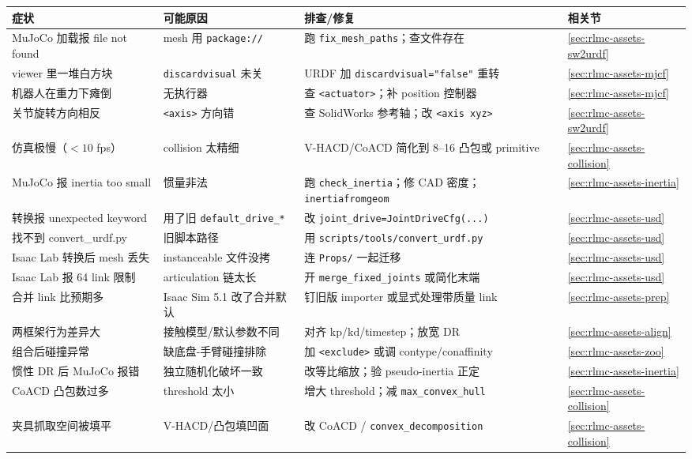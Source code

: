 \begin{center}
\small
\begin{tabular}{@{}p{4.3cm}p{3.4cm}p{4.4cm}l@{}}
\toprule
症状 & 可能原因 & 排查/修复 & 相关节 \\
\midrule
MuJoCo 加载报 file not found & mesh 用 \texttt{package://} & 跑 \texttt{fix\_mesh\_paths}；查文件存在 & \cref{sec:rlmc-assets-sw2urdf} \\
viewer 里一堆白方块 & \texttt{discardvisual} 未关 & URDF 加 \texttt{discardvisual="false"} 重转 & \cref{sec:rlmc-assets-mjcf} \\
机器人在重力下瘫倒 & 无执行器 & 查 \texttt{<actuator>}；补 position 控制器 & \cref{sec:rlmc-assets-mjcf} \\
关节旋转方向相反 & \texttt{<axis>} 方向错 & 查 SolidWorks 参考轴；改 \texttt{<axis xyz>} & \cref{sec:rlmc-assets-sw2urdf} \\
仿真极慢（$<10$ fps） & collision 太精细 & V-HACD/CoACD 简化到 8--16 凸包或 primitive & \cref{sec:rlmc-assets-collision} \\
MuJoCo 报 inertia too small & 惯量非法 & 跑 \texttt{check\_inertia}；修 CAD 密度；\texttt{inertiafromgeom} & \cref{sec:rlmc-assets-inertia} \\
转换报 unexpected keyword & 用了旧 \texttt{default\_drive\_*} & 改 \texttt{joint\_drive=JointDriveCfg(...)} & \cref{sec:rlmc-assets-usd} \\
找不到 convert\_urdf.py & 旧脚本路径 & 用 \texttt{scripts/tools/convert\_urdf.py} & \cref{sec:rlmc-assets-usd} \\
Isaac Lab 转换后 mesh 丢失 & instanceable 文件没拷 & 连 \texttt{Props/} 一起迁移 & \cref{sec:rlmc-assets-usd} \\
Isaac Lab 报 64 link 限制 & articulation 链太长 & 开 \texttt{merge\_fixed\_joints} 或简化末端 & \cref{sec:rlmc-assets-usd} \\
合并 link 比预期多 & Isaac Sim 5.1 改了合并默认 & 钉旧版 importer 或显式处理带质量 link & \cref{sec:rlmc-assets-prep} \\
两框架行为差异大 & 接触模型/默认参数不同 & 对齐 kp/kd/timestep；放宽 DR & \cref{sec:rlmc-assets-align} \\
组合后碰撞异常 & 缺底盘-手臂碰撞排除 & 加 \texttt{<exclude>} 或调 contype/conaffinity & \cref{sec:rlmc-assets-zoo} \\
惯性 DR 后 MuJoCo 报错 & 独立随机化破坏一致 & 改等比缩放；验 pseudo-inertia 正定 & \cref{sec:rlmc-assets-inertia} \\
CoACD 凸包数过多 & threshold 太小 & 增大 threshold；减 \texttt{max\_convex\_hull} & \cref{sec:rlmc-assets-collision} \\
夹具抓取空间被填平 & V-HACD/凸包填凹面 & 改 CoACD / \texttt{convex\_decomposition} & \cref{sec:rlmc-assets-collision} \\
\bottomrule
\end{tabular}
\end{center}


